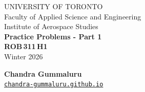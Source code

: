 \documentclass[12pt]{article}
\begin{document}
\begin{center}\large
  UNIVERSITY OF TORONTO\\
  Faculty of Applied Science and Engineering\\[1.75ex]
  Institute of Aerospace Studies\\[1.75ex]
  \textbf{Practice Problems - Part 1} \\
  \textbf{{ROB\,311\,H1}} \\[4mm]
  Winter 2026

  \vspace{3cm}
  \textbf{Chandra Gummaluru} \\
\href{https://chandra-gummaluru.github.io}{\texttt{chandra-gummaluru.github.io}}
\end{center}

\clearpage
\end{document}
